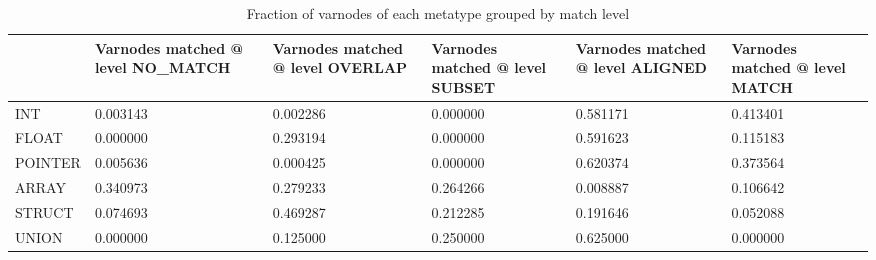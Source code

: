 \begin{table}[t]
\centering
\caption{Fraction of varnodes of each metatype grouped by match level}
\label{table:metatype-match-levels-ratios}
\begin{tabular}{lp{3.6cm}p{3.6cm}p{3.6cm}p{3.6cm}p{3.6cm}}
\toprule
{} &  Varnodes matched @ level NO\_MATCH &  Varnodes matched @ level OVERLAP &  Varnodes matched @ level SUBSET &  Varnodes matched @ level ALIGNED &  Varnodes matched @ level MATCH \\
\midrule
INT     &                           0.003143 &                          0.002286 &                         0.000000 &                          0.581171 &                        0.413401 \\
FLOAT   &                           0.000000 &                          0.293194 &                         0.000000 &                          0.591623 &                        0.115183 \\
POINTER &                           0.005636 &                          0.000425 &                         0.000000 &                          0.620374 &                        0.373564 \\
ARRAY   &                           0.340973 &                          0.279233 &                         0.264266 &                          0.008887 &                        0.106642 \\
STRUCT  &                           0.074693 &                          0.469287 &                         0.212285 &                          0.191646 &                        0.052088 \\
UNION   &                           0.000000 &                          0.125000 &                         0.250000 &                          0.625000 &                        0.000000 \\
\bottomrule
\end{tabular}
\end{table}
